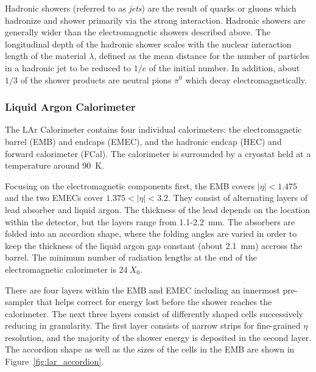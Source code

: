 Hadronic showers (referred to as \emph{jets}) are the result of quarks or gluons which hadronize and shower primarily via the strong interaction.
Hadronic showers are generally wider than the electromagnetic showers described above.
The longitudinal depth of the hadronic shower scales with the nuclear interaction length of the material $\lambda$, defined as the mean distance for the number of particles in a hadronic jet to be reduced to $1/e$ of the initial number.
In addition, about $1/3$ of the shower products are neutral pions $\pi^0$ which decay electromagnetically.


\subsubsection{Liquid Argon Calorimeter} \label{sec:lar}
The LAr Calorimeter contains four individual calorimeters: the electromagnetic barrel (EMB) and endcaps (EMEC), and the hadronic endcap (HEC) and forward calorimeter (FCal).
The calorimeter is surrounded by a cryostat held at a temperature around 90~K.

Focusing on the electromagnetic components first, the EMB covers $|\eta| < 1.475$ and the two EMECs cover $1.375 < |\eta| < 3.2$.
They consist of alternating layers of lead absorber and liquid argon.
The thickness of the lead depends on the location within the detector, but the layers range from 1.1-2.2~mm.
The absorbers are folded into an accordion shape, where the folding angles are varied in order to keep the thickness of the liquid argon gap constant (about 2.1~mm) accross the barrel.
The minimum number of radiation lengths at the end of the electromagnetic calorimeter is $24~X_0$.

There are four layers within the EMB and EMEC including an innermost pre-sampler that helps correct for energy lost before the shower reaches the calorimeter.
The next three layers consist of differently shaped cells successively reducing in granularity.
The first layer consists of narrow strips for fine-grained $\eta$ resolution, and the majority of the shower energy is deposited in the second layer.
The accordion shape as well as the sizes of the cells in the EMB are shown in Figure~\ref{fig:lar_accordion}.

